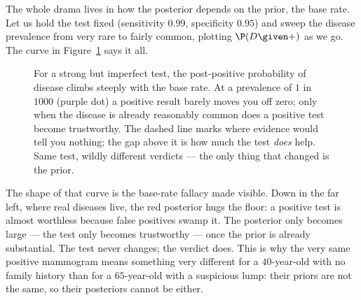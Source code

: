 The whole drama lives in how the posterior depends on the prior, the base rate. Let us
hold the test fixed (sensitivity $0.99$, specificity $0.95$) and sweep the disease
prevalence from very rare to fairly common, plotting $\P(D \given +)$ as we go. The
curve in Figure~\ref{ch05:fig-baserate} says it all.

\begin{figure}[H]
\centering
{}
\caption{For a strong but imperfect test, the post-positive probability of disease climbs
steeply with the base rate. At a prevalence of $1$ in $1000$ (purple dot) a positive
result barely moves you off zero; only when the disease is already reasonably common does
a positive test become trustworthy. The dashed line marks where evidence would tell you
nothing; the gap above it is how much the test \emph{does} help. Same test, wildly
different verdicts --- the only thing that changed is the prior.}
\label{ch05:fig-baserate}
\end{figure}

The shape of that curve is the base-rate fallacy made visible. Down in the far left,
where real diseases live, the red posterior hugs the floor: a positive test is almost
worthless because false positives swamp it. The posterior only becomes large --- the test
only becomes trustworthy --- once the prior is already substantial. The test never
changes; the verdict does. This is why the very same positive mammogram means something
very different for a $40$-year-old with no family history than for a $65$-year-old with a
suspicious lump: their priors are not the same, so their posteriors cannot be either.

